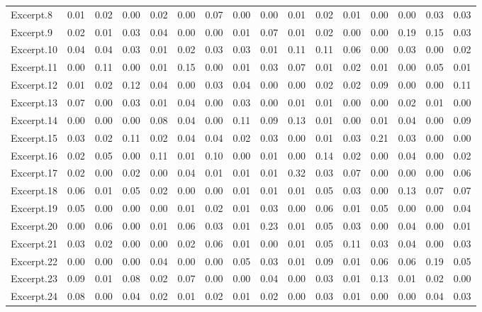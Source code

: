 \documentclass[
]{article}
\newenvironment{lltable}{\begin{landscape}\begin{center}\begin{ThreePartTable}}{\end{ThreePartTable}\end{center}\end{landscape}}
\begin{document}
\begin{lltable}
{\begin{longtable}{llllllllllllllll}
Excerpt.8 & 0.01 & 0.02 & 0.00 & 0.02 & 0.00 & 0.07 & 0.00 & 0.00 & 0.01 & 0.02 & 0.01 & 0.00 & 0.00 & 0.03 & 0.03\\
Excerpt.9 & 0.02 & 0.01 & 0.03 & 0.04 & 0.00 & 0.00 & 0.01 & 0.07 & 0.01 & 0.02 & 0.00 & 0.00 & 0.19 & 0.15 & 0.03\\
Excerpt.10 & 0.04 & 0.04 & 0.03 & 0.01 & 0.02 & 0.03 & 0.03 & 0.01 & 0.11 & 0.11 & 0.06 & 0.00 & 0.03 & 0.00 & 0.02\\
Excerpt.11 & 0.00 & 0.11 & 0.00 & 0.01 & 0.15 & 0.00 & 0.01 & 0.03 & 0.07 & 0.01 & 0.02 & 0.01 & 0.00 & 0.05 & 0.01\\
Excerpt.12 & 0.01 & 0.02 & 0.12 & 0.04 & 0.00 & 0.03 & 0.04 & 0.00 & 0.00 & 0.02 & 0.02 & 0.09 & 0.00 & 0.00 & 0.11\\
Excerpt.13 & 0.07 & 0.00 & 0.03 & 0.01 & 0.04 & 0.00 & 0.03 & 0.00 & 0.01 & 0.01 & 0.00 & 0.00 & 0.02 & 0.01 & 0.00\\
Excerpt.14 & 0.00 & 0.00 & 0.00 & 0.08 & 0.04 & 0.00 & 0.11 & 0.09 & 0.13 & 0.01 & 0.00 & 0.01 & 0.04 & 0.00 & 0.09\\
Excerpt.15 & 0.03 & 0.02 & 0.11 & 0.02 & 0.04 & 0.04 & 0.02 & 0.03 & 0.00 & 0.01 & 0.03 & 0.21 & 0.03 & 0.00 & 0.00\\
Excerpt.16 & 0.02 & 0.05 & 0.00 & 0.11 & 0.01 & 0.10 & 0.00 & 0.01 & 0.00 & 0.14 & 0.02 & 0.00 & 0.04 & 0.00 & 0.02\\
Excerpt.17 & 0.02 & 0.00 & 0.02 & 0.00 & 0.04 & 0.01 & 0.01 & 0.01 & 0.32 & 0.03 & 0.07 & 0.00 & 0.00 & 0.00 & 0.06\\
Excerpt.18 & 0.06 & 0.01 & 0.05 & 0.02 & 0.00 & 0.00 & 0.01 & 0.01 & 0.01 & 0.05 & 0.03 & 0.00 & 0.13 & 0.07 & 0.07\\
Excerpt.19 & 0.05 & 0.00 & 0.00 & 0.00 & 0.01 & 0.02 & 0.01 & 0.03 & 0.00 & 0.06 & 0.01 & 0.05 & 0.00 & 0.00 & 0.04\\
Excerpt.20 & 0.00 & 0.06 & 0.00 & 0.01 & 0.06 & 0.03 & 0.01 & 0.23 & 0.01 & 0.05 & 0.03 & 0.00 & 0.04 & 0.00 & 0.01\\
Excerpt.21 & 0.03 & 0.02 & 0.00 & 0.00 & 0.02 & 0.06 & 0.01 & 0.00 & 0.01 & 0.05 & 0.11 & 0.03 & 0.04 & 0.00 & 0.03\\
Excerpt.22 & 0.00 & 0.00 & 0.00 & 0.04 & 0.00 & 0.00 & 0.05 & 0.03 & 0.01 & 0.09 & 0.01 & 0.06 & 0.06 & 0.19 & 0.05\\
Excerpt.23 & 0.09 & 0.01 & 0.08 & 0.02 & 0.07 & 0.00 & 0.00 & 0.04 & 0.00 & 0.03 & 0.01 & 0.13 & 0.01 & 0.02 & 0.00\\
Excerpt.24 & 0.08 & 0.00 & 0.04 & 0.02 & 0.01 & 0.02 & 0.01 & 0.02 & 0.00 & 0.03 & 0.01 & 0.00 & 0.00 & 0.04 & 0.03\\

\end{longtable}}
\end{lltable}
\end{document}
